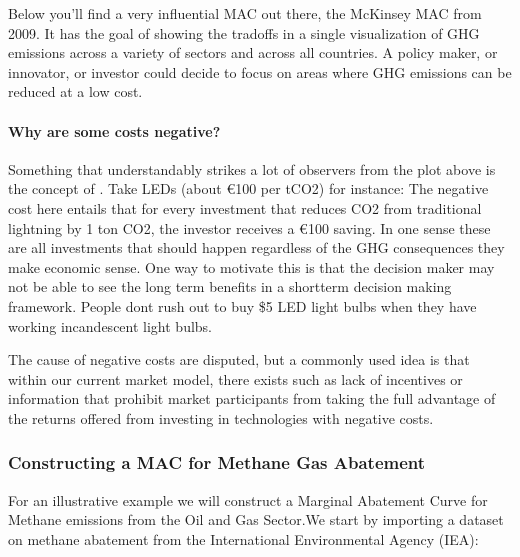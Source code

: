 \documentclass[letterpaper,10pt,english]{jupyterBook}
\begin{document}
\sphinxAtStartPar
Below you’ll find a very influential MAC out there, the McKinsey MAC from 2009. It has the goal of showing the tradoffs in a single visualization of GHG emissions across a variety of sectors and across all countries. A policy maker, or innovator, or investor could decide to focus on areas where GHG emissions can be reduced at a low cost.

\sphinxAtStartPar
{}


\paragraph{Why are some costs negative?}
\label{\detokenize{content/12-environmental/textbook1:why-are-some-costs-negative}}
\sphinxAtStartPar
Something that understandably strikes a lot of observers from the plot above is the concept of . Take LEDs (about \sphinxhyphen{} €100 per tCO2) for instance: The negative cost here entails that for every investment that reduces CO2 from traditional lightning by 1 ton CO2, the investor receives a €100 saving. In one sense these are all investments that should happen regardless of the GHG consequences they make economic sense. One way to motivate this is that the decision maker may not be able to see the long term benefits in a short\sphinxhyphen{}term decision making framework. People dont rush out to buy \$5 LED light bulbs when they have working incandescent light bulbs.

\sphinxAtStartPar
The cause of negative costs are disputed, but a commonly used idea is that within our current market model, there exists  such as lack of incentives or information that prohibit market participants from taking the full advantage of the returns offered from investing in technologies with negative costs.


\subsubsection{Constructing a MAC for Methane Gas Abatement}
\label{\detokenize{content/12-environmental/textbook1:constructing-a-mac-for-methane-gas-abatement}}
\sphinxAtStartPar
For an illustrative example we will construct a Marginal Abatement Curve for Methane emissions from the Oil and Gas Sector.We start by importing a dataset on methane abatement from the International Environmental Agency (IEA):
\end{document}

